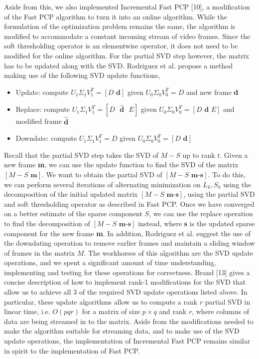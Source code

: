\documentclass[oneside]{article}
\begin{document}
Aside from this, we also implemented Incremental Fast PCP [10], a modification of the Fast PCP algorithm to turn it into an online algorithm. While the formulation of the optimization problem remains the same, the algorithm is modified to accommodate a constant incoming stream of video frames. Since the soft thresholding operator is an elementwise operator, it does not need to be modified for the online algorithm. For the partial SVD step however, the matrix has to be updated along with the SVD. Rodriguez et al. propose a method making use of the following SVD update functions, 
\begin{itemize}
\item Update: compute $U_{1}\Sigma_{1}V_{1}^{T} = [D \textbf{ d}]$ given $U_{0}\Sigma_{0}V_{0}^{T} = D$ and new frame \textbf{d}
\item Replace: compute $U_{1}\Sigma_{1}V_{1}^{T} = [D \text{ }\hat{\textbf{d}}\text{ } E]$ given $U_{0}\Sigma_{0}V_{0}^{T} = [D \textbf{ d } E]$ and modified frame $\hat{\textbf{d}}$
\item Downdate: compute $U_{1}\Sigma_{1}V_{1}^{T} = D$ given $U_{0}\Sigma_{0}V_{0}^{T} = [D \textbf{ d}]$
\end{itemize}
Recall that the partial SVD step takes the SVD of $M-S$ up to rank $t$. Given a new frame \textbf{m}, we can use the update function to find the SVD of the matrix $[M-S\textbf{ m}]$. We want to obtain the partial SVD of $[M-S \textbf{ m-s}]$. To do this, we can perform several iterations of alternating minimization on $L_{k}, S_{k}$ using the decomposition of the initial updated matrix $[M-S\textbf{ m-s}]$, using the partial SVD and soft thresholding operator as described in Fast PCP. Once we have converged on a better estimate of the sparse component $S$, we can use the replace operation to find the decomposition of $[M-S\textbf{ m-s}]$ instead, where \textbf{s} is the updated sparse component for the new frame \textbf{m}. In addition, Rodriguez et al. suggest the use of the downdating operation to remove earlier frames and maintain a sliding window of frames in the matrix $M$.\newline\newline
The workhorses of this algorithm are the SVD update operations, and we spent a significant amount of time understanding, implementing and testing for these operations for correctness. Brand [13] gives a concise description of how to implement rank-1 modifications for the SVD that allow us to achieve all 3 of the required SVD update operations listed above. In particular, these update algorithms allow us to compute a rank $r$ partial SVD in linear time, i.e. $O(pqr)$ for a matrix of size $p\times q$ and rank $r$, where columns of data are being streamed in to the matrix. Aside from the modifications needed to make the algorithm suitable for streaming data, and to make use of the SVD update operations, the implementation of Incremental Fast PCP remains similar in spirit to the implementation of Fast PCP.
\end{document}
